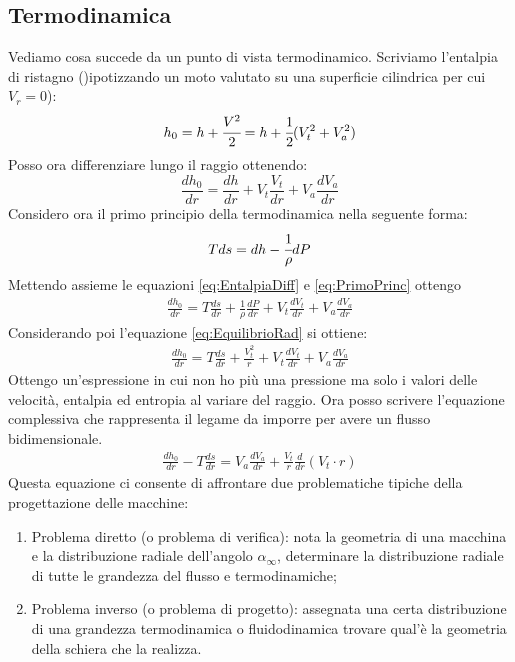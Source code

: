 \subsection{Termodinamica}
Vediamo cosa succede da un punto di vista termodinamico.
Scriviamo l'entalpia di ristagno ()ipotizzando un moto valutato su una superficie cilindrica per cui $V_r = 0$):
\begin{align*}
h_0 = h + \cfrac{V^2}{2} = h + \cfrac{1}{2}(V_t^2 + V_a^2)
\end{align*}
Posso ora differenziare lungo il raggio ottenendo:
\begin{equation}
\frac{dh_0}{dr} = \frac{dh}{dr} + V_t \frac{V_t}{dr} + V_a \frac{dV_a}{dr}
\label{eq:EntalpiaDiff}
\end{equation}
Considero ora il primo principio della termodinamica nella seguente forma:
\begin{equation}
Tds = dh - \cfrac{1}{\rho} dP
\label{eq:PrimoPrinc}
\end{equation}
Mettendo assieme le equazioni \ref{eq:EntalpiaDiff} e \ref{eq:PrimoPrinc} ottengo
\begin{align*}
\frac{dh_0}{dr} = T \frac{ds}{dr} + \frac{1}{\rho} \frac{dP}{dr} + V_t \frac{dV_t}{dr} + V_a \frac{dV_a}{dr}
\end{align*}
Considerando poi l'equazione \ref{eq:EquilibrioRad} si ottiene:
\begin{align*}
\frac{dh_0}{dr} = T \frac{ds}{dr} + \frac{V_t^2}{r} + V_t \frac{dV_t}{dr} + V_a \frac{dV_a}{dr}
\end{align*}
Ottengo un'espressione in cui non ho più una pressione ma solo i valori delle velocità, entalpia ed entropia al variare del raggio.
Ora posso scrivere l'equazione complessiva che rappresenta il legame da imporre per avere un flusso bidimensionale.
\begin{align*}
\boxed{ \frac{dh_0}{dr} - T\frac{ds}{dr} = V_a \frac{dV_a}{dr} + \frac{V_t}{r} \frac{d}{dr}(V_t \cdot r)}
\end{align*}
Questa equazione ci consente di affrontare due problematiche tipiche della progettazione delle macchine:
\begin{enumerate}
\item Problema diretto (o problema di verifica): nota la geometria di una macchina e la distribuzione radiale dell'angolo $\alpha_{\infty}$, determinare la distribuzione radiale di tutte le grandezza del flusso e termodinamiche;
\item Problema inverso (o problema di progetto): assegnata una certa distribuzione di una grandezza termodinamica o fluidodinamica trovare qual'è la geometria della schiera che la realizza.
\end{enumerate}
